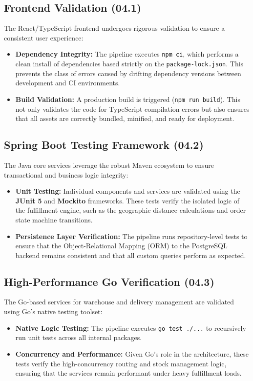 \documentclass[12pt,a4paper]{report}
\begin{document}
\subsection{Frontend Validation (04.1)}
The React/TypeScript frontend undergoes rigorous validation to ensure a consistent user experience:
\begin{itemize}
    \item \textbf{Dependency Integrity:} The pipeline executes \texttt{npm ci}, which performs a clean install of dependencies based strictly on the \texttt{package-lock.json}. This prevents the class of errors caused by drifting dependency versions between development and CI environments.
    \item \textbf{Build Validation:} A production build is triggered (\texttt{npm run build}). This not only validates the code for TypeScript compilation errors but also ensures that all assets are correctly bundled, minified, and ready for deployment.
\end{itemize}

\subsection{Spring Boot Testing Framework (04.2)}
The Java core services leverage the robust Maven ecosystem to ensure transactional and business logic integrity:
\begin{itemize}
    \item \textbf{Unit Testing:} Individual components and services are validated using the \textbf{JUnit 5} and \textbf{Mockito} frameworks. These tests verify the isolated logic of the fulfillment engine, such as the geographic distance calculations and order state machine transitions.
    \item \textbf{Persistence Layer Verification:} The pipeline runs repository-level tests to ensure that the Object-Relational Mapping (ORM) to the PostgreSQL backend remains consistent and that all custom queries perform as expected.
\end{itemize}

\subsection{High-Performance Go Verification (04.3)}
The Go-based services for warehouse and delivery management are validated using Go's native testing toolset:
\begin{itemize}
    \item \textbf{Native Logic Testing:} The pipeline executes \texttt{go test ./...} to recursively run unit tests across all internal packages. 
    \item \textbf{Concurrency and Performance:} Given Go's role in the architecture, these tests verify the high-concurrency routing and stock management logic, ensuring that the services remain performant under heavy fulfillment loads.
\end{itemize}
\end{document}
